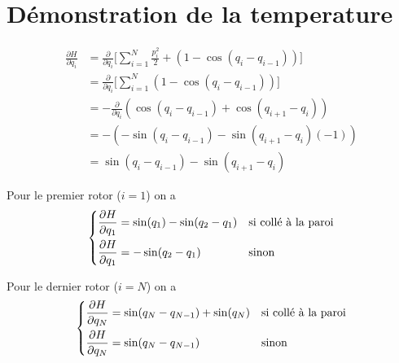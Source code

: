 \section{Démonstration de la temperature}




\begin{align}
    \frac{\partial H}{\partial q_i}
    &= \frac{\partial}{\partial q_i} \Big[ \sum_{i=1}^N \frac{p_i^2}{2}
    + (1 - \cos(q_i - q_{i-1})) \Big] \\
%
    &= \frac{\partial}{\partial q_i}
    \Big[ \sum_{i=1}^N (1 - \cos(q_i - q_{i-1})) \Big] \\
%
    &= - \frac{\partial}{\partial q_i} (\cos(q_i - q_{i-1}) + \cos(q_{i+1} - q_i)) \\
%
    &= -  (-\sin(q_i - q_{i-1}) - \sin(q_{i+1} - q_i)(-1)) \\
%
    &= \sin(q_i - q_{i-1}) - \sin(q_{i+1} - q_i)
\end{align}

Pour le premier rotor ($i = 1$) on a
\[\begin{dcases}
    \frac{\partial H}{\partial q_1} = \sin(q_1) - \sin(q_2 - q_1)
    & \text{si collé à la paroi} \\
    \frac{\partial H}{\partial q_1} = -\sin(q_2 - q_1)
    & \text{sinon}
\end{dcases}\]

Pour le dernier rotor ($i = N$) on a
\[\begin{dcases}
    \frac{\partial H}{\partial q_N} = \sin(q_N - q_{N-1}) + \sin(q_N)
    & \text{si collé à la paroi} \\
    \frac{\partial H}{\partial q_N} = \sin(q_N - q_{N-1})
    & \text{sinon}
\end{dcases}\]
